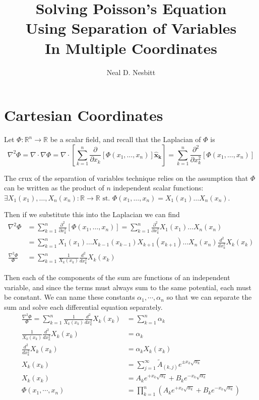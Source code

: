 \documentclass{article}
\title{Solving Poisson's Equation\\
Using Separation of Variables\\
In Multiple Coordinates}
\author{Neal D. Nesbitt}
\begin{document}
\maketitle

\section{Cartesian Coordinates}
Let $\Phi:\mathbb{R}^{n}\to\mathbb{R}$ be a scalar field, and recall that the Laplacian of $\Phi$ is
\[ \nabla^{2}\Phi = \nabla \cdot \nabla \Phi = \nabla \cdot \left[ \sum_{k=1}^{n}\frac{\partial}{\partial x_{k}} \left[ \Phi(x_{1},\dots,x_{n}) \right] \mathbf{\hat{x}_{k}} \right] = \sum_{k=1}^{n}\frac{\partial^{2}}{\partial x_{k}^{2}} \left[ \Phi(x_{1},\dots,x_{n}) \right] \]

The crux of the separation of variables technique relies on the assumption that $\Phi$ can be written as the product of $n$ independent scalar functions: $\exists X_{1}(x_{1}),\dots,X_{n}(x_{n}):\mathbb{R}\to\mathbb{R} \text{ st. } \Phi(x_{1},\dots,x_{n}) =  X_{1}(x_{1}) \dots X_{n}(x_{n})$.

Then if we substitute this into the Laplacian we can find
\begin{align*}
\nabla^{2}\Phi &= \sum_{k=1}^{n}\frac{\partial^{2}}{\partial x_{k}^{2}} \left[ \Phi(x_{1},\dots,x_{n}) \right] = \sum_{k=1}^{n}\frac{\partial^{2}}{\partial x_{k}^{2}} X_{1}(x_{1}) \dots X_{n}(x_{n})\\
&= \sum_{k=1}^{n} X_{1}(x_{1}) \dots X_{k-1}(x_{k-1}) X_{k+1}(x_{k+1}) \dots X_{n}(x_{n}) \frac{d^{2}}{dx_{k}^{2}} X_{k}(x_{k})\\
\frac{\nabla^{2}\Phi }{\Phi} &= \sum_{k=1}^{n} \frac{1}{X_{k}(x_{k})} \frac{d^{2}}{dx_{k}^{2}} X_{k}(x_{k})
\end{align*}

Then each of the components of the sum are functions of an independent variable, and since the terms must always sum to the same potential, each must be constant. We can name these constants $\alpha_{1},\cdots,\alpha_{n}$ so that we can separate the sum and solve each differential equation separately.
\begin{align*}
\frac{\nabla^{2}\Phi }{\Phi} = \sum_{k=1}^{n} \frac{1}{X_{k}(x_{k})} \frac{d^{2}}{dx_{k}^{2}} X_{k}(x_{k}) &= \sum_{k=1}^{n} \alpha_{k}\\
\frac{1}{X_{k}(x_{k})} \frac{d^{2}}{dx_{k}^{2}} X_{k}(x_{k}) &= \alpha_{k}\\
\frac{d^{2}}{dx_{k}^{2}} X_{k}(x_{k}) &= \alpha_{k}X_{k}(x_{k})\\
X_{k}(x_{k}) &= \sum_{j=1}^{\infty} \tilde{A}_{(k,j)}e^{\pm x_{k}\sqrt{\alpha_{k}}}\\
X_{k}(x_{k}) &= A_{k}e^{+x_{k}\sqrt{\alpha_{k}}} + B_{k}e^{-x_{k}\sqrt{\alpha_{k}}}\\
\Phi(x_{1},\cdots,x_{n}) &= \prod_{k=1}^{n} \left( A_{k}e^{+x_{k}\sqrt{\alpha_{k}}} + B_{k}e^{-x_{k}\sqrt{\alpha_{k}}} \right)
\end{align*}
\end{document}
